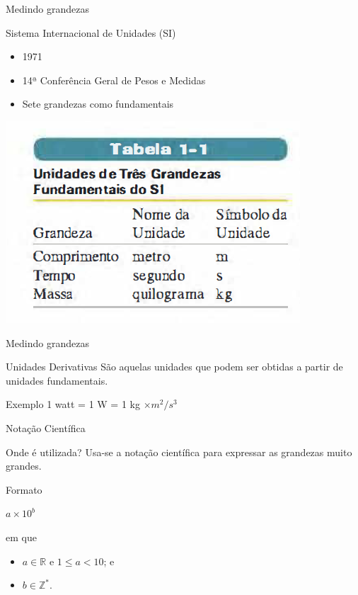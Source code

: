 \documentclass[xcolor=dvipsnames,table]{beamer}
\begin{document}
	\begin{frame}{Medindo grandezas}
		\begin{block}{Sistema Internacional de Unidades (SI)}
			\begin{itemize}
				\item 1971
				\item 14ª Conferência Geral de Pesos e Medidas
				\item Sete grandezas como fundamentais
			\end{itemize}
		\end{block} \pause
		\begin{center}
			\includegraphics[scale=0.5]{images/tabela1-1.png}
		\end{center}
	\end{frame}
	
	\begin{frame}{Medindo grandezas}
		\begin{block}{Unidades Derivativas}
			São aquelas unidades que podem ser obtidas a partir de unidades fundamentais.
		\end{block} \pause
		\begin{block}{Exemplo}
			1 watt = 1 W = 1 kg $\times m^2 / s^3$
		\end{block}
	\end{frame}
	
	\begin{frame}{Notação Científica}
		\begin{block}{Onde é utilizada?}
			Usa-se a notação científica para expressar as grandezas muito grandes.
		\end{block} \pause
		\begin{block}{Formato}
			\begin{center}
				$a \times 10^b$
			\end{center}
			em que \pause
			\begin{itemize}
				\item $a \in \mathbb{R}$ e $1 \leq a < 10$; e
				\item $b \in \mathbb{Z}^*$.
			\end{itemize}
		\end{block}
	\end{frame}
	
\end{document}
